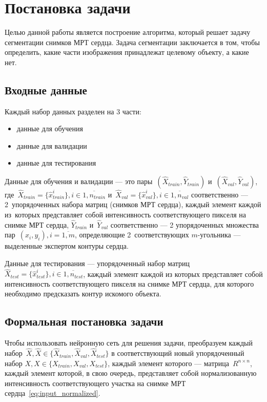 \section{Постановка задачи}

Целью данной работы является построение алгоритма, который решает задачу сегментации снимков МРТ сердца. Задача сегментации заключается в том, чтобы определить, какие части изображения принадлежат целевому объекту, а какие нет. 

\subsection{Входные данные}

Каждый набор данных разделен на 3 части: 

\begin{itemize}
  \item данные для обучения
  \item данные для валидации
  \item данные для тестирования
\end{itemize}

Данные для обучения и валидации — это пары~$(\hat{X}_{train},\hat{Y}_{train})$ 
и~$(\hat{X}_{val},\hat{Y}_{val})$, 
где~$\hat{X}_{train} = \{\hat{x}_{train}^{i}\}, i\in{}\overline{1,n_{train}}$ 
и~$\hat{X}_{val} = \{\hat{x}_{val}^{i}\}, i\in{}\overline{1,n_{val}}$ соответственно 
— 2~упорядоченных набора матриц (снимков МРТ сердца), каждый элемент каждой из~которых 
представляет собой интенсивность соответствующего пикселя на снимке МРТ сердца, 
$\hat{Y}_{train}$ и~$\hat{Y}_{val}$ соответственно 
— 2 упорядоченных множества пар~$(x_{i},y_{i}), i = \overline{1,m}$, 
определяющие 2~соответствующих \mbox{$m$-угольника} 
— выделенные экспертом контуры сердца.

Данные для тестирования — упорядоченный набор матриц $\hat{X}_{test} = \{\hat{x}_{test}^{i}\}, i\in{}\overline{1,n_{test}}$, каждый элемент каждой из которых представляет собой интенсивность соответствующего пикселя на снимке МРТ сердца, для которого необходимо предсказать контур искомого объекта.

\subsection{Формальная постановка задачи}

Чтобы использовать нейронную сеть для решения задачи, преобразуем каждый набор~$\hat{X},\hat{X}\in{}\{\hat{X}_{train},\hat{X}_{val},\hat{X}_{test}\}$ в соответствующий новый упорядоченный набор $X,X\in{}\{X_{train},X_{val},X_{test}\}$, каждый элемент которого — матрица~$R^{n\times{}n}$, каждый элемент которой, в свою очередь, представляет собой нормализованную интенсивность соответствующего участка на снимке МРТ сердца~\eqref{eq:input_normalized}. 

